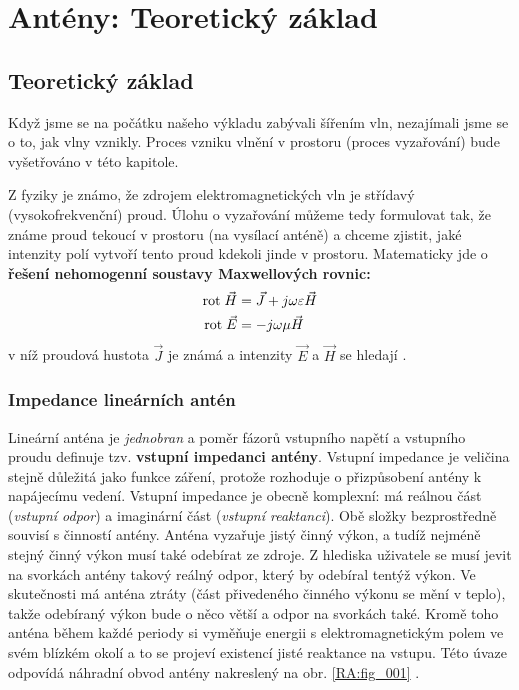 \chapter{Antény: Teoretický základ}\label{chap:ra_antennatheory}
\minitoc

  \section{Teoretický základ}
    Když jsme se na počátku našeho výkladu zabývali šířením vln, nezajímali jsme se o to, jak vlny 
    vznikly. Proces vzniku vlnění v prostoru (proces vyzařování) bude vyšetřováno v této kapitole. 
    
    Z fyziky je známo, že zdrojem elektromagnetických vln je střídavý (vysokofrekvenční) proud. 
    Úlohu o vyzařování můžeme tedy formulovat tak, že známe proud tekoucí v prostoru (na vysílací 
    anténě) a chceme zjistit, jaké intenzity polí vytvoří tento proud kdekoli jinde v prostoru. 
    Matematicky jde o \textbf{řešení nehomogenní soustavy Maxwellových rovnic:}
    \begin{align}\label{RA:eq_ant01}
      \mathrm{rot}\;\vec{H} &= \vec{J} + j\omega\varepsilon\vec{H} \\
      \mathrm{rot}\;\vec{E} &= -j\omega\mu\vec{H}
    \end{align}
    v níž proudová hustota \(\vec{J}\) je známá a intenzity \(\vec{E}\) a \(\vec{H}\) se hledají 
    \cite[s.~33]{Hanus2002}. 
    
    \subsection{Impedance lineárních antén}
      Lineární anténa je \emph{jednobran} a poměr fázorů vstupního napětí a vstupního proudu 
      definuje  tzv. \textbf{vstupní impedanci antény}. Vstupní impedance je veličina stejně 
      důležitá jako funkce záření, protože rozhoduje o přizpůsobení antény k napájecímu vedení. 
      Vstupní impedance je obecně komplexní: má reálnou část (\emph{vstupní odpor}) a imaginární 
      část (\emph{vstupní reaktanci}). Obě složky bezprostředně souvisí s činností antény. Anténa 
      vyzařuje jistý činný výkon, a tudíž nejméně stejný činný výkon musí také odebírat ze zdroje. 
      Z hlediska uživatele se musí jevit na svorkách antény takový reálný odpor, který by odebíral 
      tentýž výkon. Ve skutečnosti má anténa ztráty (část přivedeného činného výkonu se mění v 
      teplo), takže odebíraný výkon bude o něco větší a odpor na svorkách také. Kromě toho anténa 
      během každé periody si vyměňuje energii s elektromagnetickým polem ve svém blízkém 
      okolí a to se projeví existencí jisté reaktance na vstupu. Této úvaze odpovídá náhradní obvod 
      antény nakreslený na obr. \ref{RA:fig_001} \cite[s.~44]{Hanus2002}.

